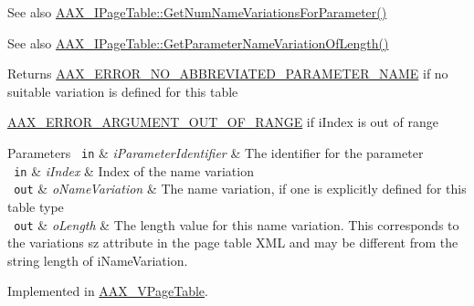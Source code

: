 \begin{DoxyItemize}
\item \begin{DoxySeeAlso}{See also}
\mbox{\hyperlink{a01849_af8be797a3ec7ed3117e720dd29ea7cc7}{A\+A\+X\+\_\+\+I\+Page\+Table\+::\+Get\+Num\+Name\+Variations\+For\+Parameter()}}
\end{DoxySeeAlso}

\item \begin{DoxySeeAlso}{See also}
\mbox{\hyperlink{a01849_a6ddd61f6ba18b8be8141363d5234ed9d}{A\+A\+X\+\_\+\+I\+Page\+Table\+::\+Get\+Parameter\+Name\+Variation\+Of\+Length()}}
\end{DoxySeeAlso}
\begin{DoxyReturn}{Returns}
\mbox{\hyperlink{a00494_a5f8c7439f3a706c4f8315a9609811937ab7383b0169f6dfa5f86b1fefd6c58ae2}{A\+A\+X\+\_\+\+E\+R\+R\+O\+R\+\_\+\+N\+O\+\_\+\+A\+B\+B\+R\+E\+V\+I\+A\+T\+E\+D\+\_\+\+P\+A\+R\+A\+M\+E\+T\+E\+R\+\_\+\+N\+A\+ME}} if no suitable variation is defined for this table

\mbox{\hyperlink{a00494_a5f8c7439f3a706c4f8315a9609811937a8dd2fdd469583a046765eae9178678a3}{A\+A\+X\+\_\+\+E\+R\+R\+O\+R\+\_\+\+A\+R\+G\+U\+M\+E\+N\+T\+\_\+\+O\+U\+T\+\_\+\+O\+F\+\_\+\+R\+A\+N\+GE}} if {\ttfamily i\+Index} is out of range
\end{DoxyReturn}

\begin{DoxyParams}[1]{Parameters}
\mbox{\texttt{ in}}  & {\em i\+Parameter\+Identifier} & The identifier for the parameter \\
\hline
\mbox{\texttt{ in}}  & {\em i\+Index} & Index of the name variation \\
\hline
\mbox{\texttt{ out}}  & {\em o\+Name\+Variation} & The name variation, if one is explicitly defined for this table type \\
\hline
\mbox{\texttt{ out}}  & {\em o\+Length} & The length value for this name variation. This corresponds to the variation\textquotesingle{}s {\ttfamily sz} attribute in the page table X\+ML and may be different from the string length of {\ttfamily i\+Name\+Variation}. \\
\hline
\end{DoxyParams}

\end{DoxyItemize}

Implemented in \mbox{\hyperlink{a01929_a0a009cc5bfa2e0424d6ed58087bd5962}{A\+A\+X\+\_\+\+V\+Page\+Table}}.

